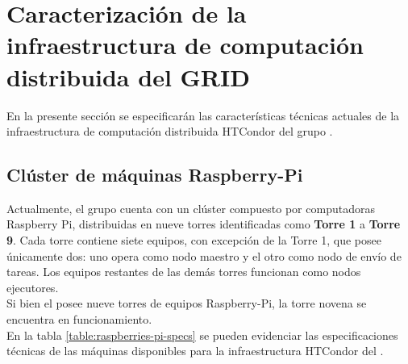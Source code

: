 

\section{Caracterización de la infraestructura de computación distribuida del GRID}
\noindent
En la presente sección se especificarán las características técnicas actuales de la infraestructura de computación distribuida HTCondor del grupo \GRID.


\subsection{Clúster de máquinas Raspberry-Pi}
\noindent

Actualmente, el grupo \GRID cuenta con un clúster compuesto por computadoras Raspberry Pi, distribuidas en nueve torres identificadas como \textbf{Torre 1} a \textbf{Torre 9}. Cada torre contiene siete equipos, con excepción de la Torre 1, que posee únicamente dos: uno opera como nodo maestro y el otro como nodo de envío de tareas. Los equipos restantes de las demás torres funcionan como nodos ejecutores.
\\
Si bien el \GRID posee nueve torres de equipos Raspberry-Pi, la torre novena se encuentra en funcionamiento. \\


En la tabla \ref{table:raspberries-pi-specs} se pueden evidenciar las especificaciones técnicas de las máquinas disponibles para la infraestructura HTCondor del \GRID.
\\


